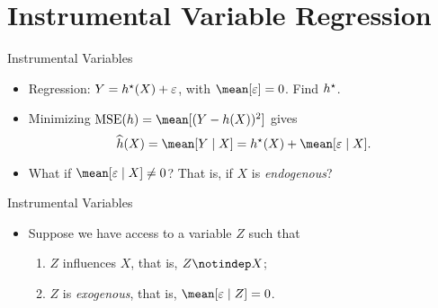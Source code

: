 \documentclass[aspectratio=169]{beamer}
\begin{document}
    \frame{\titlepage}

    \section{Instrumental Variable Regression}

    \begin{frame}{Instrumental Variables}
        \begin{itemize}
            \item<1-> Regression: $ Y = h^{ \star } ( X ) + \varepsilon $, with $ \mean [ \varepsilon ] = 0 $.
                Find $ h^{ \star } $.
            \item<2-> Minimizing $ \mse ( h ) = \mean [ ( Y - h ( X ) )^2 ] $ gives 
                \begin{equation*}
                    \hat{ h } ( X ) = \mean [ Y \mid X ] = \hstar ( X ) + \mean [ \varepsilon \mid X ]
                .\end{equation*}
            \item<3-> What if $ \mean [ \varepsilon \mid X ] \neq 0 $?
                That is, if $ X $ is \emph{endogenous}?
        \end{itemize}
    \end{frame}

    \begin{frame}{Instrumental Variables}
        \begin{itemize}
            \item<1-> Suppose we have access to a variable $ Z $ such that
                \begin{enumerate}
                    \item<2-> $ Z $ influences $ X $, that is, $ Z \notindep X $;
                    \item<3-> $ Z $ is \emph{exogenous}, that is, $ \mean [ \varepsilon \mid Z ] = 0 $.
                \end{enumerate}
        \end{itemize}
    \end{frame}
\end{document}
